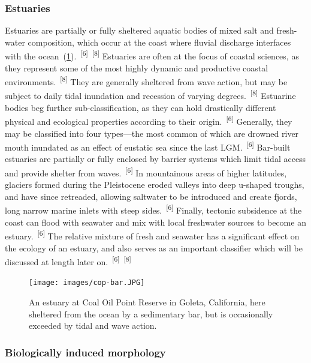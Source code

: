\documentclass{article}
\begin{document}
\subsubsection{Estuaries}


\par{Estuaries are partially or fully sheltered aquatic bodies of mixed salt and fresh-water composition, which occur at the coast where fluvial discharge interfaces with the ocean~(\cref{figure11}).~\textsuperscript{[6]}~\textsuperscript{[8]} Estuaries are often at the focus of coastal sciences, as they represent some of the most highly dynamic and productive coastal environments.~\textsuperscript{[8]} They are generally sheltered from wave action, but may be subject to daily tidal inundation and recession of varying degrees.~\textsuperscript{[8]} Estuarine bodies beg further sub-classification, as they can hold drastically different physical and ecological properties according to their origin.~\textsuperscript{[6]} Generally, they may be classified into four types---the most common of which are drowned river mouth inundated as an effect of eustatic sea since the last LGM.~\textsuperscript{[6]} Bar-built estuaries are partially or fully enclosed by barrier systems which limit tidal access and provide shelter from waves.~\textsuperscript{[6]} In mountainous areas of higher latitudes, glaciers formed during the Pleistocene eroded valleys into deep u-shaped troughs, and have since retreaded, allowing saltwater to be introduced and create fjords, long narrow marine inlets with steep sides.~\textsuperscript{[6]} Finally, tectonic subsidence at the coast can flood with seawater and mix with local freshwater sources to become an estuary.~\textsuperscript{[6]} The relative mixture of fresh and seawater has a significant effect on the ecology of an estuary, and also serves as an important classifier which will be discussed at length later on.~\textsuperscript{[6]}~\textsuperscript{[8]}}


\begin{figure}
    \centering
    \texttt{[image: images/cop-bar.JPG]}
    \caption{An estuary at Coal Oil Point Reserve in Goleta, California, here sheltered from the ocean by a sedimentary bar, but is occasionally exceeded by tidal and wave action.}
    \label{figure11}
\end{figure}

\subsubsection{Biologically induced morphology}
\end{document}
